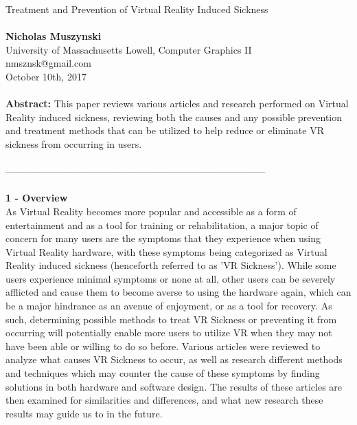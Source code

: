 \documentclass{article}
\begin{document}
\noindent
\Huge
\sloppy
Treatment and Prevention of Virtual Reality Induced Sickness \\ \\
\normalsize
\textbf{Nicholas Muszynski} \\
University of Massachusetts Lowell, Computer Graphics II \\
nmsznsk@gmail.com \\
October 10th, 2017 \\ \\

\noindent
\textbf{Abstract:} This paper reviews various articles and research performed on Virtual Reality induced sickness, reviewing both the causes and any possible prevention and treatment methods that can be utilized to help reduce or eliminate VR sickness from occurring in users. \\ \\
--------------------------------------------------------------------------------- \\ \\
\textbf{1 - Overview} \\
As Virtual Reality becomes more popular and accessible as a form of entertainment and as a tool for training or rehabilitation, a major topic of concern for many users are the symptoms that they experience when using Virtual Reality hardware, with these symptoms being categorized as Virtual Reality induced sickness (henceforth referred to as 'VR Sickness'). While some users experience minimal symptoms or none at all, other users can be severely afflicted and cause them to become averse to using the hardware again, which can be a major hindrance as an avenue of enjoyment, or as a tool for recovery. As such, determining possible methods to treat VR Sickness or preventing it from occurring will potentially enable more users to utilize VR when they may not have been able or willing to do so before. Various articles were reviewed to analyze what causes VR Sickness to occur, as well as research different methods and techniques which may counter the cause of these symptoms by finding solutions in both hardware and software design. The results of these articles are then examined for similarities and differences, and what new research these results may guide us to in the future. \\ \\
\end{document}
